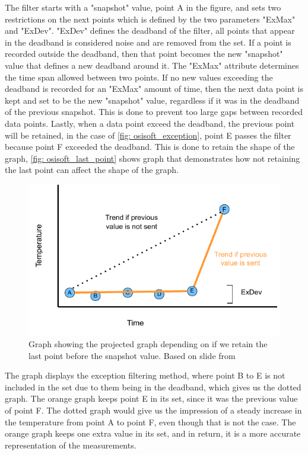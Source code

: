 \documentclass[main.tex]{subfiles}
\begin{document}
The filter starts with a "snapshot" value, point A in the figure, and sets two restrictions on the next points which is defined by the two parameters "ExMax" and "ExDev". "ExDev" defines the deadband of the filter, all points that appear in the deadband is considered noise and are removed from the set. If a point is recorded outside the deadband, then that point becomes the new "snapshot" value that defines a new deadband around it. The "ExMax" attribute determines the time span allowed between two points. If no new values exceeding the deadband is recorded for an "ExMax" amount of time, then the next data point is kept and set to be the new "snapshot" value, regardless if it was in the deadband of the previous snapshot. This is done to prevent too large gaps between recorded data points. Lastly, when a data point exceed the deadband, the previous point will be retained, in the case of \autoref{fig: osisoft_exception}, point E passes the filter because point F exceeded the deadband. This is done to retain the shape of the graph, \autoref{fig: osisoft_last_point} shows graph that demonstrates how not retaining the last point can affect the shape of the graph.

\begin{figure}[!htpb]
    \centering
    \includegraphics[width=12cm, scale=4]{images/exception_process_2.pdf}
    \caption{Graph showing the projected graph depending on if we retain the last point before the snapshot value. Based on slide from\cite{osisoft_exception}}
    \label{fig: osisoft_last_point}
\end{figure}
\FloatBarrier 
 
The graph displays the exception filtering method, where point B to E is not included in the set due to them being in the deadband, which gives us the dotted graph. The orange graph keeps point E in its set, since it was the previous value of point F. The dotted graph would give us the impression of a steady increase in the temperature from point A to point F, even though that is not the case. The orange graph keeps one extra value in its set, and in return, it is a more accurate representation of the measurements.
 
\end{document}
